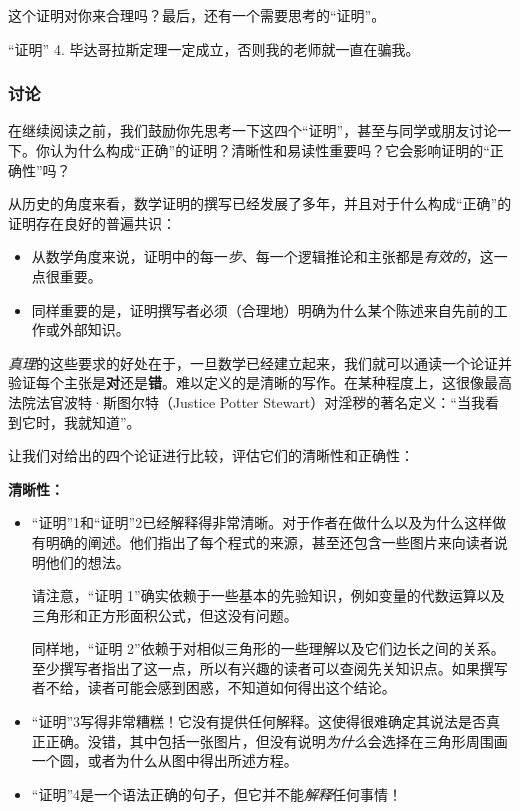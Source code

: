 这个证明对你来合理吗？最后，还有一个需要思考的“证明”。

\begin{proofs}{“证明” 4.}
    毕达哥拉斯定理一定成立，否则我的老师就一直在骗我。
\end{proofs} 

\subsubsection*{讨论}

在继续阅读之前，我们鼓励你先思考一下这四个“证明”，甚至与同学或朋友讨论一下。你认为什么构成“正确”的证明？清晰性和易读性重要吗？它会影响证明的“正确性”吗？

从历史的角度来看，数学证明的撰写已经发展了多年，并且对于什么构成“正确”的证明存在良好的普遍共识：

\begin{itemize}
    \item 从数学角度来说，证明中的每一\textit{步}、每一个逻辑推论和主张都是\textit{有效的}，这一点很重要。
    \item 同样重要的是，证明撰写者必须（合理地）明确为什么某个陈述来自先前的工作或外部知识。
\end{itemize}

\textit{真理}的这些要求的好处在于，一旦数学已经建立起来，我们就可以通读一个论证并验证每个主张是\textbf{对}还是\textbf{错}。难以定义的是清晰的写作。在某种程度上，这很像最高法院法官波特·斯图尔特（Justice Potter Stewart）对淫秽的著名定义：“当我看到它时，我就知道”。

让我们对给出的四个论证进行比较，评估它们的清晰性和正确性：

\textbf{清晰性：}

\begin{itemize}
    \item “证明”1和“证明”2已经解释得非常清晰。对于作者在做什么以及为什么这样做有明确的阐述。他们指出了每个程式的来源，甚至还包含一些图片来向读者说明他们的想法。
    
    请注意，“证明 1”确实依赖于一些基本的先验知识，例如变量的代数运算以及三角形和正方形面积公式，但这没有问题。

    同样地，“证明 2”依赖于对相似三角形的一些理解以及它们边长之间的关系。至少撰写者指出了这一点，所以有兴趣的读者可以查阅先关知识点。如果撰写者不给，读者可能会感到困惑，不知道如何得出这个结论。
    \item “证明”3写得非常糟糕！它没有提供任何解释。这使得很难确定其说法是否真正正确。没错，其中包括一张图片，但没有说明\textit{为什么}会选择在三角形周围画一个圆，或者为什么从图中得出所述方程。
    \item “证明”4是一个语法正确的句子，但它并不能\textit{解释}任何事情！
\end{itemize}

